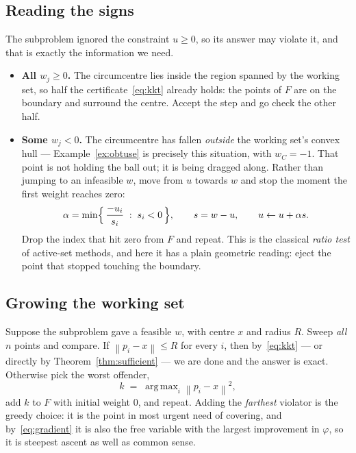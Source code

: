 \documentclass[11pt,a4paper]{article}
\theoremstyle{plain}
\theoremstyle{definition}
\theoremstyle{remark}
\DeclareMathOperator*{\argmax}{arg\,max}
\newcommand{\norm}[1]{\left\lVert #1 \right\rVert}
\begin{document}
\subsection{Reading the signs}

The subproblem ignored the constraint $u\ge0$, so its answer may violate it, and
that is exactly the information we need.

\begin{itemize}
  \item \textbf{All $w_j \ge 0$.} The circumcentre lies inside the region spanned
    by the working set, so half the certificate~\eqref{eq:kkt} already holds: the
    points of $F$ are on the boundary and surround the centre. Accept the step
    and go check the other half.
  \item \textbf{Some $w_j < 0$.} The circumcentre has fallen \emph{outside} the
    working set's convex hull --- Example~\ref{ex:obtuse} is precisely this
    situation, with $w_C=-1$. That point is not holding the ball out; it is being
    dragged along. Rather than jumping to an infeasible $w$, move from $u$ towards
    $w$ and stop the moment the first weight reaches zero:
    \begin{equation}
      \label{eq:ratio}
      \alpha = \min\Bigl\{\, \frac{-u_i}{s_i} \;:\; s_i < 0 \,\Bigr\},
      \qquad s = w - u,
      \qquad u \leftarrow u + \alpha s .
    \end{equation}
    Drop the index that hit zero from $F$ and repeat. This is the classical
    \emph{ratio test} of active-set methods, and here it has a plain geometric
    reading: eject the point that stopped touching the boundary.
\end{itemize}

\subsection{Growing the working set}

Suppose the subproblem gave a feasible $w$, with centre $x$ and radius $R$. Sweep
\emph{all} $n$ points and compare. If $\norm{p_i-x}\le R$ for every $i$, then
by~\eqref{eq:kkt} --- or directly by Theorem~\ref{thm:sufficient} --- we are done
and the answer is exact. Otherwise pick the worst offender,
\[
  k \;=\; \argmax_i \norm{p_i - x}^2 ,
\]
add $k$ to $F$ with initial weight $0$, and repeat. Adding the \emph{farthest}
violator is the greedy choice: it is the point in most urgent need of covering,
and by~\eqref{eq:gradient} it is also the free variable with the largest
improvement in $\varphi$, so it is steepest ascent as well as common sense.
\end{document}
